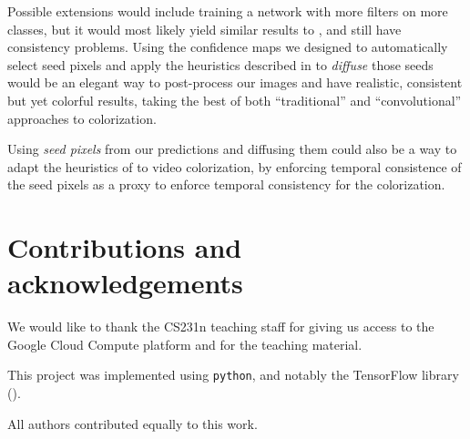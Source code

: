 \documentclass[10pt,twocolumn,letterpaper]{article}
\begin{document}
Possible extensions would include training a network with more filters on more classes, but it would most likely yield similar results to \cite{zhang2016colorful}, and still have consistency problems. Using the confidence maps we designed to automatically select seed pixels and apply the heuristics described in \cite{levin2004colorization} to \textit{diffuse} those seeds would be an elegant way to post-process our images and have realistic, consistent but yet colorful results, taking the best of both ``traditional'' and ``convolutional'' approaches to colorization.

Using \textit{seed pixels} from our predictions and diffusing them could also be a way to adapt the heuristics of \cite{zhu2017video} to video colorization, by enforcing temporal consistence of the seed pixels as a proxy to enforce temporal consistency for the colorization.


\section*{Contributions and acknowledgements}

We would like to thank the CS231n teaching staff for giving us access to the Google Cloud Compute platform and for the teaching material.

This project was implemented using \texttt{python}, and notably the  TensorFlow library (\cite{abadi2016tensorflow}).

All authors contributed equally to this work.

{\small


}
\end{document}
